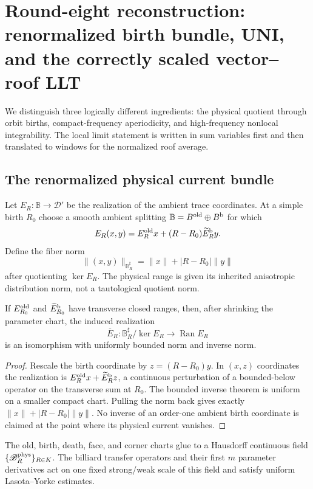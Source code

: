 \section{Round-eight reconstruction: renormalized birth bundle, UNI, and the correctly scaled vector--roof LLT}
\label{sec:r8-a2}

We distinguish three logically different ingredients: the physical quotient
through orbit births, compact-frequency aperiodicity, and high-frequency
nonlocal integrability.  The local limit statement is written in sum variables
first and then translated to windows for the normalized roof average.

\subsection{The renormalized physical current bundle}

Let $E_R:\mathbb B\to\mathscr D'$ be the realization of the ambient trace
coordinates.  At a simple birth $R_0$ choose a smooth ambient splitting
$\mathbb B=B^{\rm old}\oplus B^{\rm b}$ for which
\[
 E_R(x,y)=E_R^{\rm old}x+(R-R_0)\widetilde E_R^{\rm b}y.
\]
Define the fiber norm
\[
 \|(x,y)\|_{\mathbb B_R^\sharp}
 =\|x\|+|R-R_0|\|y\|
\]
after quotienting $\ker E_R$.  The physical range is given its inherited
anisotropic distribution norm, not a tautological quotient norm.

\begin{lemma}
\label{lem:r8-a2-birth}
If $E_{R_0}^{\rm old}$ and $\widetilde E_{R_0}^{\rm b}$ have transverse closed
ranges, then, after shrinking the parameter chart, the induced realization
\[
 \overline E_R:\mathbb B_R^\sharp/\ker E_R\longrightarrow\operatorname{Ran}E_R
\]
is an isomorphism with uniformly bounded norm and inverse norm.
\end{lemma}

\begin{proof}
Rescale the birth coordinate by $z=(R-R_0)y$.  In $(x,z)$ coordinates the
realization is $E_R^{\rm old}x+\widetilde E_R^{\rm b}z$, a continuous
perturbation of a bounded-below operator on the transverse sum at $R_0$.
The bounded inverse theorem is uniform on a smaller compact chart.  Pulling the
norm back gives exactly $\|x\|+|R-R_0|\|y\|$.  No inverse of an order-one
ambient birth coordinate is claimed at the point where its physical current
vanishes.
\end{proof}

\begin{theorem}
\label{thm:r8-a2-field}
The old, birth, death, face, and corner charts glue to a Hausdorff continuous
field $\{\mathscr B_R^{\rm phys}\}_{R\in K}$.  The billiard transfer operators
and their first $m$ parameter derivatives act on one fixed strong/weak scale
of this field and satisfy uniform Lasota--Yorke estimates.
\end{theorem}

